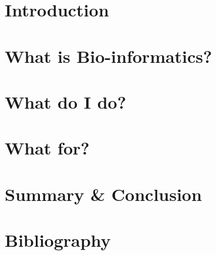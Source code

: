\documentclass[fleqn,10pt,c]{beamer}
\begin{document}
\section{Introduction}


\section{What is Bio-informatics?}


\section{What do I do?}



\section{What for?}


\section{Summary \& Conclusion}


\appendix
\section[x]{Bibliography}

\end{document}
